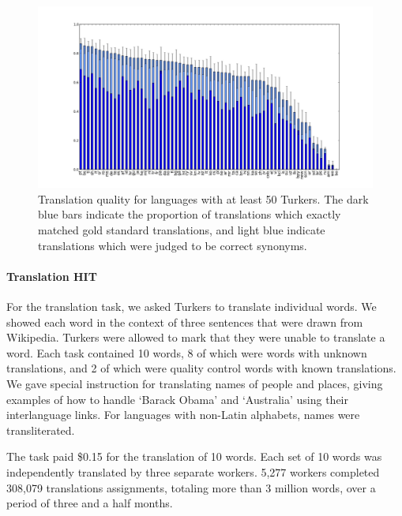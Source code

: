 \documentclass[11pt]{article}
\begin{document}
\begin{figure}[h]
\begin{center}
\includegraphics[width=\linewidth]{../version1-figures/quality_bar.png}
\caption{Translation quality for languages with at least 50 Turkers.  The dark blue bars indicate the proportion of translations which exactly matched gold standard translations, and light blue indicate translations which were judged to be correct synonyms.}
\label{hitlangqual} 
\end{center}
\end{figure}



\paragraph{Translation HIT}

For the translation task, we asked Turkers to translate individual words.  We showed each word in the context of three sentences that were drawn from Wikipedia.  
Turkers were allowed to mark that they were unable to translate a word. Each task contained 10 words, 8 of which were words with unknown translations, and 2 of which were quality control words with known translations.   
We gave special instruction for translating names of people and places, giving examples of how to handle `Barack Obama' and `Australia' using their interlanguage links. For languages with non-Latin alphabets, names were transliterated. 

The task paid \$0.15 for the translation of 10 words.  
Each set of 10 words was independently translated by three separate workers.  5,277 workers completed 308,079 translations assignments, totaling more than 3 million words, over a period of three and a half months.
\end{document}
